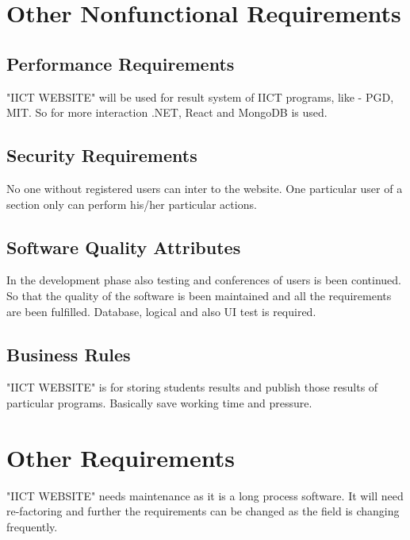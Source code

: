 \documentclass{scrreprt}
\begin{document}
	
	\chapter{Other Nonfunctional Requirements}
	
	\section{Performance Requirements}
	"IICT WEBSITE" will be used for result system of IICT programs, like - PGD, MIT. So for more interaction .NET, React and MongoDB is used. 
	
	\section{Security Requirements}
	No one without registered users can inter to the website. One particular user of a section only can perform his/her particular actions. 
	
	\section{Software Quality Attributes}
	In the development phase also testing and conferences of users is been continued. So that the quality of the software is been maintained and all the requirements are been fulfilled.
	\newline
	Database, logical and also UI test is required. 
	
	\section{Business Rules}
	"IICT WEBSITE" is for storing students results and publish those results of particular programs.
	\newline
	Basically save working time and pressure. 
	
	
	\chapter{Other Requirements}
	"IICT WEBSITE" needs maintenance as it is a long process software. It will need re-factoring and further the requirements can be changed as the field is changing frequently. 
	
\end{document}
